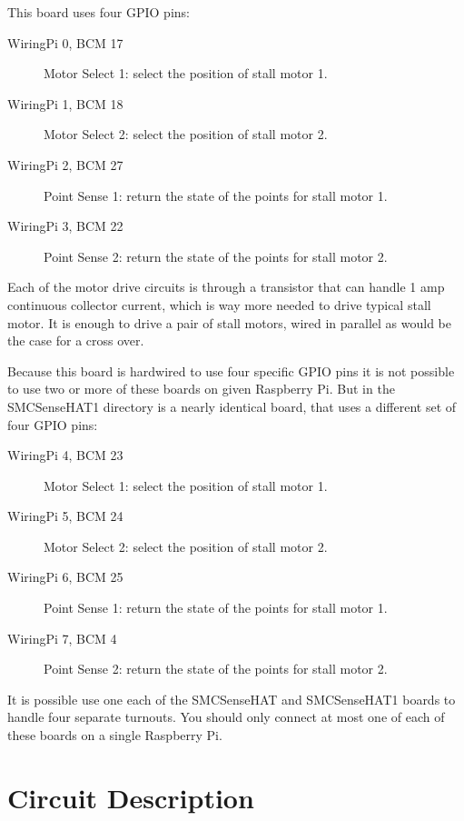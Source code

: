 This board uses four GPIO pins:

\begin{description}
\item[WiringPi 0, BCM 17] Motor Select 1: select the position of stall motor 
1. 
\item[WiringPi 1, BCM 18] Motor Select 2: select the position of stall motor 
2. 
\item[WiringPi 2, BCM 27] Point Sense 1: return the state of the points for 
stall motor 1. 
\item[WiringPi 3, BCM 22] Point Sense 2: return the state of the points for 
stall motor 2. 
\end{description}

Each of the motor drive circuits is through a transistor that can handle 1 amp 
continuous collector current, which is way more needed to drive typical stall 
motor.  It is enough to drive a pair of stall motors, wired in parallel as 
would be the case for a cross over.

Because this board is hardwired to use four specific GPIO pins it is not 
possible to use two or more of these boards on given Raspberry Pi.  But in the 
SMCSenseHAT1 directory is a nearly identical board, that uses a different set 
of four GPIO pins:

\begin{description}
\item[WiringPi 4, BCM 23] Motor Select 1: select the position of stall motor 
1. 
\item[WiringPi 5, BCM 24] Motor Select 2: select the position of stall motor 
2. 
\item[WiringPi 6, BCM 25] Point Sense 1: return the state of the points for 
stall motor 1. 
\item[WiringPi 7, BCM 4] Point Sense 2: return the state of the points for 
stall motor 2. 
\end{description}

It is possible use one each of the SMCSenseHAT and SMCSenseHAT1 boards to 
handle four separate turnouts.  You should only connect at most one of each of 
these boards on a single Raspberry Pi.

\section{Circuit Description}

